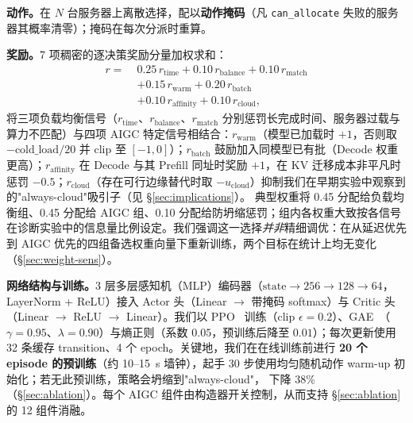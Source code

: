 \textbf{动作。}在 $N$ 台服务器上离散选择，配以\textbf{动作掩码}（凡 \texttt{can\_allocate} 失败的服务器其概率清零）；掩码在每次分派时重算。

\textbf{奖励。}7 项稠密的逐决策奖励分量加权求和：
\begin{equation}
  \label{eq:reward}
  \begin{aligned}
    r =\;& 0.25\,r_{\text{time}}
        + 0.10\,r_{\text{balance}}
        + 0.10\,r_{\text{match}} \\
       &+ 0.15\,r_{\text{warm}}
        + 0.20\,r_{\text{batch}} \\
       &+ 0.10\,r_{\text{affinity}}
        + 0.10\,r_{\text{cloud}},
  \end{aligned}
\end{equation}
将三项负载均衡信号（$r_{\text{time}}$、$r_{\text{balance}}$、$r_{\text{match}}$ 分别惩罚长完成时间、服务器过载与算力不匹配）与四项 AIGC 特定信号相结合：$r_{\text{warm}}$（模型已加载时 $+1$，否则取 $-\text{cold\_load}/20$ 并 clip 至 $[-1,0]$）；$r_{\text{batch}}$ 鼓励加入同模型已有批（Decode 权重更高）；$r_{\text{affinity}}$ 在 Decode 与其 Prefill 同址时奖励 $+1$，在 KV 迁移成本非平凡时惩罚 $-0.5$；$r_{\text{cloud}}$（存在可行边缘替代时取 $-u_{\text{cloud}}$）抑制我们在早期实验中观察到的"always-cloud"吸引子（见 \S\ref{sec:implications}）。
典型权重将 0.45 分配给负载均衡组、0.45 分配给 AIGC 组、0.10 分配给防坍缩惩罚；组内各权重大致按各信号在诊断实验中的信息量比例设定。我们强调这一选择\emph{并非}精细调优：在从延迟优先到 AIGC 优先的四组备选权重向量下重新训练，两个目标在统计上均无变化（\S\ref{sec:weight-sens}）。

\textbf{网络结构与训练。}3 层多层感知机（MLP）编码器（$\text{state} \to 256 \to 128 \to 64$，LayerNorm + ReLU）接入 Actor 头（Linear $\to$ 带掩码 softmax）与 Critic 头（Linear $\to$ ReLU $\to$ Linear）。我们以 PPO~\cite{schulman2017ppo} 训练（clip $\epsilon{=}0.2$）、GAE~\cite{schulman2015gae}（$\gamma{=}0.95$、$\lambda{=}0.90$）与熵正则（系数 $0.05$，预训练后降至 $0.01$）；每次更新使用 32 条缓存 transition、4 个 epoch。关键地，我们在在线训练前进行 \textbf{20 个 episode 的预训练}（约 10--15~s 墙钟），起手 30 步使用均匀随机动作 warm-up 初始化；若无此预训练，策略会坍缩到"always-cloud"，\slo{} 下降 $38\%$（\S\ref{sec:ablation}）。每个 AIGC 组件由构造器开关控制，从而支持 \S\ref{sec:ablation} 的 12 组件消融。
